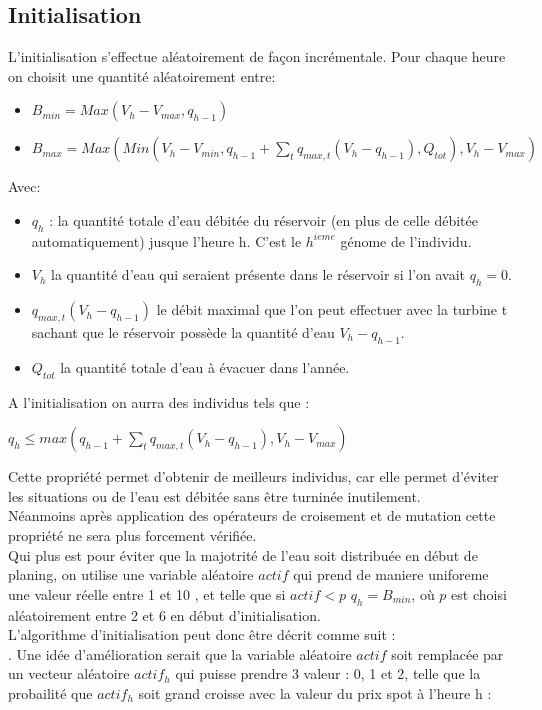\documentclass[a4paper]{report}
\begin{document}
\subsection*{Initialisation}
L'initialisation s'effectue aléatoirement de façon incrémentale.
Pour chaque heure on choisit une quantité aléatoirement entre:
\begin{itemize}
  \item  $B_{min}=Max(V_h-V_{max},q_{h-1})$
  \item $B_{max}= Max(Min(V_h-V_{min},q_{h-1}+\sum_t q_{max,t}(V_h-q_{h-1}),Q_{tot}),V_{h}-V_{max})$\\
\end{itemize}  
Avec:\\
\begin{itemize}
  \item $q_h$ : la quantité totale d'eau débitée du réservoir (en plus de celle débitée automatiquement) jusque l'heure h. C'est le $h^{ieme}$ génome de l'individu.
  \item $V_h$ la quantité d'eau qui seraient présente dans le réservoir si l'on avait $q_h=0$.
  \item $q_{max,t}(V_h-q_{h-1})$ le débit maximal que l'on peut effectuer avec la turbine t sachant que le réservoir possède la quantité d'eau $V_h - q_{h-1}$.
  \item $Q_{tot} $ la quantité totale d'eau à évacuer dans l'année.
\end{itemize}
A l'initialisation on aurra des individus tels que :
\begin{center}
  $q_h \leq max(q_{h-1}+\sum_t q_{max,t}(V_h-q_{h-1}),V_{h}-V_{max})$
\end{center}
Cette propriété permet d'obtenir de meilleurs individus, car elle permet d'éviter les situations ou de l'eau est débitée sans être turninée inutilement.\\
Néanmoins après application des opérateurs de croisement et de mutation cette propriété ne sera plus forcement vérifiée.\\
Qui plus est pour éviter que la majotrité de l'eau soit distribuée en début de planing, on utilise une variable aléatoire $actif$ qui prend de maniere uniforeme une valeur réelle entre 1 et 10 , et telle que si $actif<p$ $q_h=B_{min}$, où $p$ est choisi aléatoirement entre 2 et 6 en début d'initialisation.\\
L'algorithme d'initialisation peut donc être décrit comme suit :\\
. 
 Une idée d'amélioration serait que la variable aléatoire $actif$ soit remplacée par un vecteur aléatoire $actif_h$ qui puisse prendre 3 valeur : 0, 1 et 2, telle que la probailité que $actif_h$ soit grand croisse avec la valeur du prix spot à l'heure h :
\end{document}

